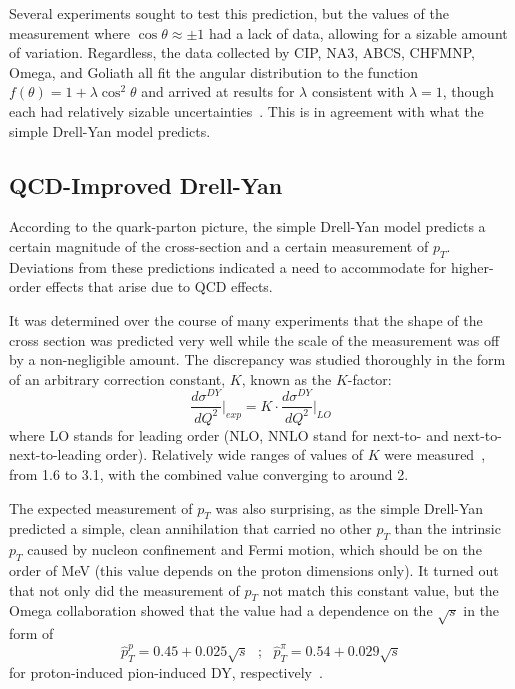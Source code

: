 Several experiments sought to test this prediction, but the values of the measurement where $\cos\theta \approx \pm 1$ had a lack of data, allowing for a sizable amount of variation. Regardless, the data collected by CIP, NA3, ABCS, CHFMNP, Omega, and Goliath all fit the angular distribution to the function $f(\theta)=1+\lambda\cos^2\theta$ and arrived at results for $\lambda$ consistent with $\lambda=1$, though each had relatively sizable uncertainties~\cite{Kenyon:1982tg}. This is in agreement with what the simple Drell-Yan model predicts.

\subsection{QCD-Improved Drell-Yan}

According to the quark-parton picture, the simple Drell-Yan model predicts a certain magnitude of the cross-section and a certain measurement of $p_T$. Deviations from these predictions indicated a need to accommodate for higher-order effects that arise due to QCD effects. 

It was determined over the course of many experiments that the shape of the cross section was predicted very well while the scale of the measurement was off by a non-negligible amount. The discrepancy was studied thoroughly in the form of an arbitrary correction constant, $K$, known as the $K$-factor:
\begin{equation}
\frac{d\sigma^{DY}}{dQ^2}\bigr|_{exp} = K\cdot \frac{d\sigma^{DY}}{dQ^2}\bigr|_{LO}
\end{equation}
where LO stands for leading order (NLO, NNLO stand for next-to- and next-to-next-to-leading order). Relatively wide ranges of values of $K$ were measured~\cite{GrossoPilcher:1986nk}, from 1.6 to 3.1, with the combined value converging to around 2.

The expected measurement of $p_T$ was also surprising, as the simple Drell-Yan predicted a simple, clean annihilation that carried no other $p_T$ than the intrinsic $p_T$ caused by nucleon confinement and Fermi motion, which should be on the order of \unit[400]{MeV} (this value depends on the proton dimensions only). It turned out that not only did the measurement of $p_T$ not match this constant value, but the Omega collaboration showed that the value had a dependence on the $\sqrt{s}$ in the form of 
\begin{equation}
\hat{p}_T^p = 0.45 + 0.025 \sqrt{s}\ \ \ ; \ \ \ \hat{p}^\pi_T = 0.54 + 0.029 \sqrt{s}
\end{equation} for proton-induced pion-induced DY, respectively~\cite{Kenyon:1982tg}.

